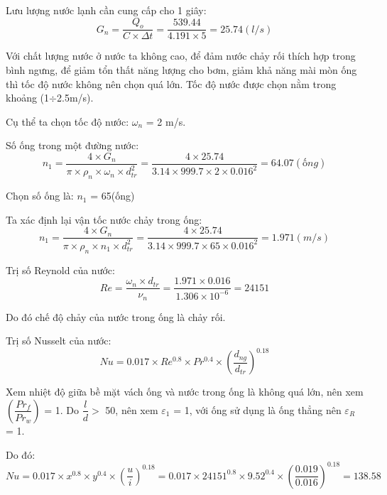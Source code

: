 Lưu lượng nước lạnh cần cung cấp cho 1 giây:
\begin{equation*}
	G_{n} = \dfrac{Q_{o}}{C\times\Delta t} = \dfrac{539.44}{4.191 \times 5}=25.74(l/s)
\end{equation*}

Với chất lượng nước ở nước ta không cao, để đảm nước chảy rối thích hợp trong bình ngưng, để giảm tổn thất năng lượng cho bơm, giảm khả năng mài mòn ống thì tốc độ nước không nên chọn quá lớn. Tốc độ nước được chọn nằm trong khoảng (1$\div$2.5m/s).

Cụ thể ta chọn tốc độ nước: $\omega_{n}$ = 2 m/s.

Số ống trong một đường nước:
\begin{equation*}
	n_{1} = \dfrac{4\times G_{n}}{\pi\times\rho_{n}\times\omega_{n}\times d_{tr}^2} = \dfrac{4 \times 25.74}{3.14 \times 999.7 \times 2 \times 0.016^2}=64.07(ống)
\end{equation*}

Chọn số ống là: $n_{1}$  = 65(ống)

Ta xác định lại vận tốc nước chảy trong ống:
\begin{equation*}
	n_{1} = \dfrac{4\times G_{n}}{\pi\times\rho_{n}\times n_{1}\times d_{tr}^2} = \dfrac{4 \times 25.74}{3.14 \times 999.7 \times 65 \times 0.016^2}=1.971(m/s)
\end{equation*}

Trị số Reynold của nước:
\begin{equation*}
	Re = \dfrac{\omega_{n}\times d_{tr}}{\nu_{n}} = \dfrac{1.971 \times 0.016}{1.306 \times 10^{-6}}=24151
\end{equation*}

Do đó chế độ chảy của nước trong ống là chảy rối.

Trị số Nusselt của nước:
\begin{equation*}
	Nu = 0.017\times Re^{0.8}\times Pr^{0.4}\times\left(\dfrac{d_{ng}}{d_{tr}}\right)^{0.18} 
\end{equation*}

Xem nhiệt độ giữa bề mặt vách ống và nước trong ống là không quá lớn, nên xem $\left(\dfrac{Pr_{f}}{Pr_{w}}\right)$ = 1. Do $\dfrac{l}{d} >$ 50, nên xem $\varepsilon_{1}$ = 1, với ống sử dụng là ống thẳng nên $\varepsilon_{R}$ = 1.

Do đó:
\begin{equation*}
	Nu = 0.017\times x^{0.8}\times y^{0.4}\times\left(\dfrac{u}{i}\right)^{0.18} = 0.017 \times 24151^{0.8} \times 9.52^{0.4} \times (\dfrac{0.019}{0.016})^{0.18}=138.58
\end{equation*}

